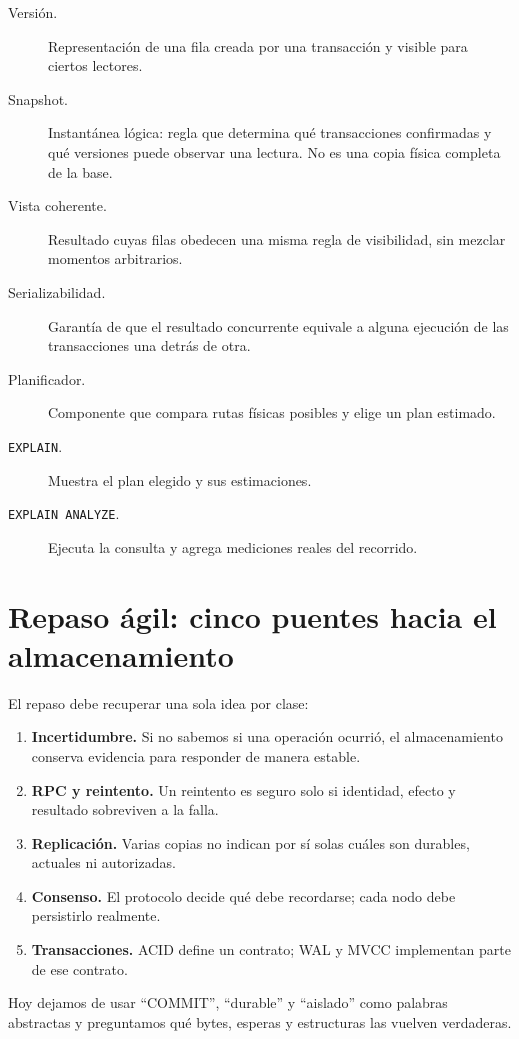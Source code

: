\documentclass[variant=apuntes,cover=institutional,mode=screen]{ua-engineering-v6-article}
\begin{document}
\begin{description}
\item[Versión.] Representación de una fila creada por una transacción y visible para ciertos lectores.
\item[Snapshot.] Instantánea lógica: regla que determina qué transacciones confirmadas y qué versiones puede observar una lectura. No es una copia física completa de la base.
\item[Vista coherente.] Resultado cuyas filas obedecen una misma regla de visibilidad, sin mezclar momentos arbitrarios.
\item[Serializabilidad.] Garantía de que el resultado concurrente equivale a alguna ejecución de las transacciones una detrás de otra.
\item[Planificador.] Componente que compara rutas físicas posibles y elige un plan estimado.
\item[\texttt{EXPLAIN}.] Muestra el plan elegido y sus estimaciones.
\item[\texttt{EXPLAIN ANALYZE}.] Ejecuta la consulta y agrega mediciones reales del recorrido.
\end{description}

\section{Repaso ágil: cinco puentes hacia el almacenamiento}

El repaso debe recuperar una sola idea por clase:

\begin{enumerate}
\item \textbf{Incertidumbre.} Si no sabemos si una operación ocurrió, el almacenamiento conserva evidencia para responder de manera estable.
\item \textbf{RPC y reintento.} Un reintento es seguro solo si identidad, efecto y resultado sobreviven a la falla.
\item \textbf{Replicación.} Varias copias no indican por sí solas cuáles son durables, actuales ni autorizadas.
\item \textbf{Consenso.} El protocolo decide qué debe recordarse; cada nodo debe persistirlo realmente.
\item \textbf{Transacciones.} ACID define un contrato; WAL y MVCC implementan parte de ese contrato.
\end{enumerate}

\begin{uakeybox}
Hoy dejamos de usar ``COMMIT'', ``durable'' y ``aislado'' como palabras abstractas y preguntamos qué bytes, esperas y estructuras las vuelven verdaderas.
\end{uakeybox}
\end{document}
